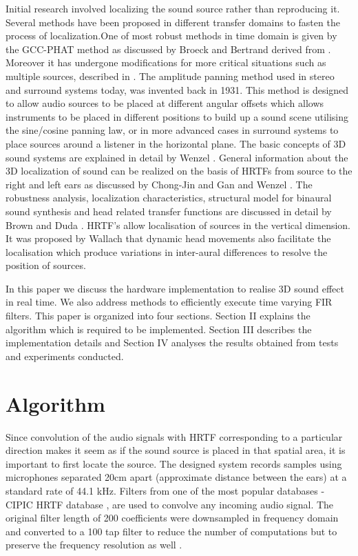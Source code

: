\documentclass[conference]{IEEEtran}
\begin{document}
Initial research involved localizing the sound source rather than reproducing it. Several methods have been proposed in different transfer domains to fasten the process of localization.One of most robust methods in time domain is given by the GCC-PHAT method as discussed by Broeck and Bertrand \cite{one} derived from \cite{two}. Moreover it has undergone modifications for more critical situations such as multiple sources, described in \cite{three}.\newline
The amplitude panning method used
in stereo and surround systems today, was invented back in 1931. This method is designed to allow audio sources to be placed at different angular offsets which allows instruments to be placed in different positions to build up a sound scene utilising the sine/cosine panning law, or in more advanced cases in surround systems to place sources around a listener in the horizontal plane. The basic concepts of 3D sound systems are explained in detail by Wenzel \cite{four}. General information about the 3D localization of sound can be realized on the basis of HRTFs from source to the right and left ears as discussed by Chong-Jin and Gan \cite{six} and Wenzel \cite{four}. The  robustness  analysis,  localization  characteristics,  structural  model  for  binaural  sound  synthesis  and  head related transfer functions are discussed in detail by Brown and Duda \cite{seven} . HRTF’s allow
localisation of sources in the vertical dimension. It was proposed by Wallach \cite{eight} that dynamic head movements also facilitate the localisation which produce variations in inter-aural differences to resolve the position of sources. \newline

In this paper we discuss the hardware implementation to realise 3D sound effect in real time. We also address methods to efficiently execute time varying FIR filters. This paper is organized into four sections. Section II explains the algorithm which is required to be implemented. Section III describes the implementation details and Section IV analyses the results obtained from tests and experiments conducted.  


\section{Algorithm}

Since convolution of the audio signals with HRTF corresponding to a particular direction makes it seem as if the sound source is placed in that spatial area, it is important to first locate the source. The designed system records samples using microphones separated 20cm apart (approximate distance between the ears) at a standard rate of 44.1 kHz. Filters from one of the most popular databases - CIPIC HRTF database \cite{cipic}, are used to convolve any incoming audio signal. The original filter length of 200 coefficients were downsampled in frequency domain and converted to a 100 tap filter to reduce the number of computations but to preserve the frequency resolution as well .
\end{document}
